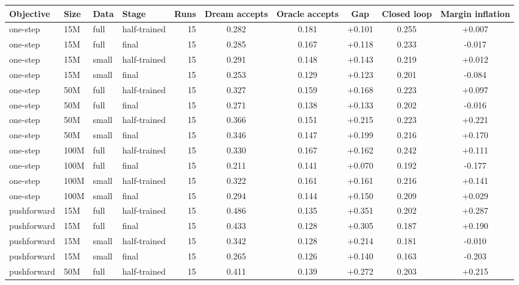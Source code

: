 \setlength{\tabcolsep}{2.5pt}
\begin{tabular*}{\textwidth}{@{\extracolsep{\fill}}llllrccccc@{}}
\toprule
Objective & Size & Data & Stage & Runs & Dream accepts & Oracle accepts & Gap & Closed loop & Margin inflation \\
\midrule
one-step & 15M & full & half-trained & 15 & 0.282 & 0.181 & +0.101 & 0.255 & +0.007 \\
one-step & 15M & full & final & 15 & 0.285 & 0.167 & +0.118 & 0.233 & \mbox{-}0.017 \\
one-step & 15M & small & half-trained & 15 & 0.291 & 0.148 & +0.143 & 0.219 & +0.012 \\
one-step & 15M & small & final & 15 & 0.253 & 0.129 & +0.123 & 0.201 & \mbox{-}0.084 \\
one-step & 50M & full & half-trained & 15 & 0.327 & 0.159 & +0.168 & 0.223 & +0.097 \\
one-step & 50M & full & final & 15 & 0.271 & 0.138 & +0.133 & 0.202 & \mbox{-}0.016 \\
one-step & 50M & small & half-trained & 15 & 0.366 & 0.151 & +0.215 & 0.223 & +0.221 \\
one-step & 50M & small & final & 15 & 0.346 & 0.147 & +0.199 & 0.216 & +0.170 \\
one-step & 100M & full & half-trained & 15 & 0.330 & 0.167 & +0.162 & 0.242 & +0.111 \\
one-step & 100M & full & final & 15 & 0.211 & 0.141 & +0.070 & 0.192 & \mbox{-}0.177 \\
one-step & 100M & small & half-trained & 15 & 0.322 & 0.161 & +0.161 & 0.216 & +0.141 \\
one-step & 100M & small & final & 15 & 0.294 & 0.144 & +0.150 & 0.209 & +0.029 \\
pushforward & 15M & full & half-trained & 15 & 0.486 & 0.135 & +0.351 & 0.202 & +0.287 \\
pushforward & 15M & full & final & 15 & 0.433 & 0.128 & +0.305 & 0.187 & +0.190 \\
pushforward & 15M & small & half-trained & 15 & 0.342 & 0.128 & +0.214 & 0.181 & \mbox{-}0.010 \\
pushforward & 15M & small & final & 15 & 0.265 & 0.126 & +0.140 & 0.163 & \mbox{-}0.203 \\
pushforward & 50M & full & half-trained & 15 & 0.411 & 0.139 & +0.272 & 0.203 & +0.215 \\

\end{tabular*}
